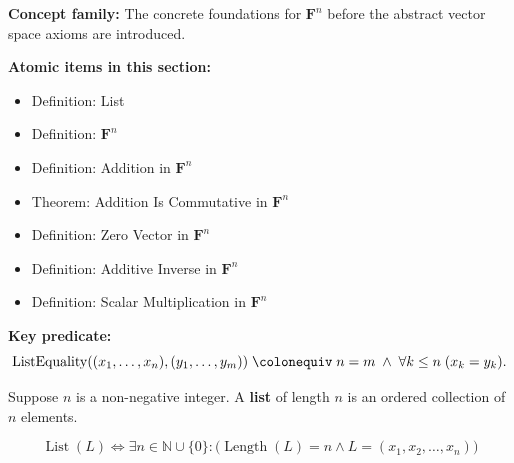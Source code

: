
\begin{tcolorbox}[colback=gray!6, colframe=gray!40, arc=2pt,
  left=6pt, right=6pt, top=4pt, bottom=4pt,
  title={\small\textbf{Toolkit --- Vector Space Preliminaries}},
  fonttitle=\small\bfseries]
\textbf{Concept family:} The concrete foundations for $\mathbf{F}^n$ before the
abstract vector space axioms are introduced.

\medskip
\textbf{Atomic items in this section:}
\begin{itemize}
  \item Definition: List
  \item Definition: $\mathbf{F}^n$
  \item Definition: Addition in $\mathbf{F}^n$
  \item Theorem: Addition Is Commutative in $\mathbf{F}^n$
  \item Definition: Zero Vector in $\mathbf{F}^n$
  \item Definition: Additive Inverse in $\mathbf{F}^n$
  \item Definition: Scalar Multiplication in $\mathbf{F}^n$
\end{itemize}

\medskip
\textbf{Key predicate:}
\[
  \operatorname{ListEquality}((x_1,\ldots,x_n),(y_1,\ldots,y_m))
  \;\colonequiv\;
  n = m \;\wedge\; \forall k \le n\;(x_k = y_k).
\]
\end{tcolorbox}


\begin{tcolorbox}[colback=defbox, colframe=defborder, arc=2pt,
  left=6pt, right=6pt, top=4pt, bottom=4pt,
  title={\small\textbf{Definition (List)}},
  fonttitle=\small\bfseries]
\begin{definition}[List]
\label{def:list}
Suppose $n$ is a non-negative integer. A \textbf{list} of length $n$ is an ordered collection of $n$ elements.
\end{definition}
\end{tcolorbox}

\begin{remark*}
\[
\operatorname{List}(L) \iff \exists n \in \mathbb{N} \cup \{0\} : \bigl( \operatorname{Length}(L) = n \land L = (x_1, x_2, \dots, x_n) \bigr)
\]
\end{remark*}

